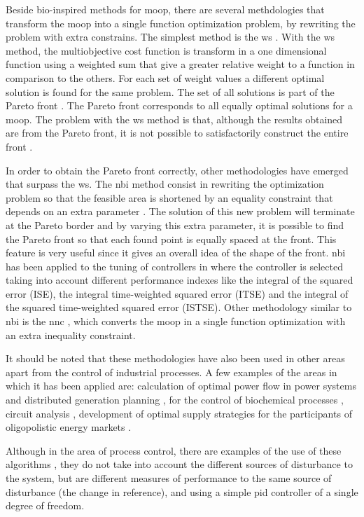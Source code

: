 Beside bio-inspired methods for \gls{moop}, there are several methdologies that transform the \gls{moop} into a single function optimization problem, by rewriting the problem with extra constrains. The simplest method is the \gls{ws} \citep{Marler2004}. With the \gls{ws} method, the multiobjective cost function is transform in a one dimensional function using a weighted sum that give a greater relative weight to a function in comparison to the others. For each set of weight values a different optimal solution is found for the same problem. The set of all solutions is part of the Pareto front \citep{Marler2004}. The Pareto front corresponds to all equally optimal solutions for a \gls{moop}. The problem with the \gls{ws} method is that, although the results obtained are from the Pareto front, it is not possible to satisfactorily construct the entire front \citep{Das1997,Messac2000,Marler2010}.

In order to obtain the Pareto front correctly, other methodologies have emerged that surpass the \gls{ws}. The \gls{nbi} method consist in rewriting the optimization problem so that the feasible area is shortened by an equality constraint that depends on an extra parameter \citep{Das1998}. The solution of this new problem will terminate at the Pareto border and by varying this extra parameter, it is possible to find the Pareto front so that each found point is equally spaced at the front. This feature is very useful since it gives an overall idea of the shape of the front. \gls{nbi} has been applied to the tuning of controllers in \citet{Gambier2009} where the controller is selected taking into account different performance indexes like the integral of the squared error (ISE), the integral time-weighted squared error (ITSE) and the integral of the squared time-weighted squared error (ISTSE). Other methodology similar to \gls{nbi} is the \gls{nnc} \citep{Messac2003}, which converts the \gls{moop} in a single function optimization with an extra inequality constraint.

It should be noted that these methodologies have also been used in other areas apart from the control of industrial processes. A few examples of the areas in which it has been applied are: calculation of optimal power flow in power systems \citep{Roman2006}  and distributed generation planning \citep{Zangeneh2007},  for the control of biochemical processes \citep{Logist2009}, circuit analysis \citep{Stehr2003}, development of optimal supply strategies for the participants of oligopolistic energy markets \citep{Vahidinasab2010}.

Although in the area of process control, there are examples of the use of these algorithms \citep{Gambier2009}, they do not take into account the different sources of disturbance to the system, but are different measures of performance to the same source of disturbance (the change in reference), and using a simple \gls{pid} controller of a single degree of freedom.
